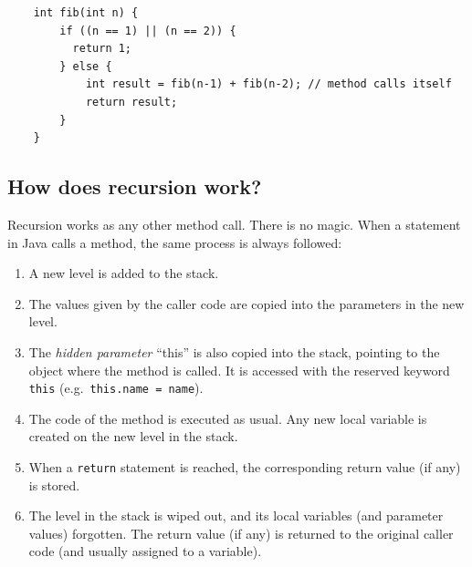 \begin{verbatim}
    int fib(int n) {
        if ((n == 1) || (n == 2)) {
          return 1; 
        } else {
            int result = fib(n-1) + fib(n-2); // method calls itself
            return result;
        }
    }
\end{verbatim}

\subsection{How does recursion work?}
\label{sec:how-does-recursion}


Recursion works as any other method call. There is no magic. When a
statement in Java calls a method, the same process is always 
followed: 

\begin{enumerate}
\item A new level is added to the stack.
\item The values given by the caller code are copied into the
  parameters in the new level.
\item The \emph{hidden parameter} ``this'' is also copied into the stack,
  pointing to the object where the method is called. It is accessed
  with the reserved keyword \verb+this+ (e.g.~\verb+this.name = name+).
\item The code of the method is executed as usual. Any new local
  variable is created on the new level in the stack. 
\item When a \verb+return+ statement is reached, the corresponding
  return value (if any) is stored.
\item The level in the stack is wiped out, and its local variables
  (and parameter values) forgotten. The return value (if any) is
  returned to the original caller code (and usually assigned to a
  variable).
\end{enumerate}

